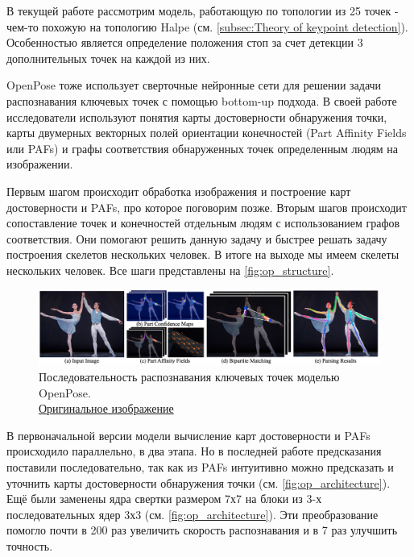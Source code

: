 В текущей работе рассмотрим модель, работающую по топологии из 25 точек - чем-то похожую на топологию Halpe (см. \autoref{subsec:Theory of keypoint detection}). Особенностью является определение положения стоп за счет детекции 3 дополнительных точек на каждой из них.

OpenPose тоже использует сверточные нейронные сети для решении задачи распознавания ключевых точек с помощью bottom-up подхода. В своей работе исследователи используют понятия карты достоверности обнаружения точки, карты двумерных векторных полей ориентации конечностей (Part Affinity Fields или PAFs) и графы соответствия обнаруженных точек определенным людям на изображении.

Первым шагом происходит обработка изображения и построение карт достоверности и PAFs, про которое поговорим позже. Вторым шагов происходит сопоставление точек и конечностей отдельным людям с использованием графов соответствия. Они помогают решить данную задачу и быстрее решать задачу построения скелетов нескольких человек. В итоге на выходе мы имеем скелеты нескольких человек. Все шаги представлены на \autoref{fig:op_structure}.

\begin{figure}[h]
	\centering
	\includegraphics[width=\textwidth]{./images/OpenPose/structure}
	\caption{Последовательность распознавания ключевых точек моделью OpenPose.\\ \href{https://miro.medium.com/0*rXablSR1mU2Mn-cG.png}{Оригинальное изображение}}
	\label{fig:op_structure}
\end{figure}

В первоначальной версии модели \cite{OpenPose_first} вычисление карт достоверности и PAFs происходило параллельно, в два этапа. Но в последней работе \cite{OpenPose} предсказания поставили последовательно, так как из PAFs интуитивно можно предсказать и уточнить карты достоверности обнаружения точки (см. \autoref{fig:op_architecture}). Ещё были заменены ядра свертки размером 7х7 на блоки из 3-х последовательных ядер 3х3 (см. \autoref{fig:op_architecture}). Эти преобразование помогло почти в 200 раз увеличить скорость распознавания и в 7 раз улучшить точность.

